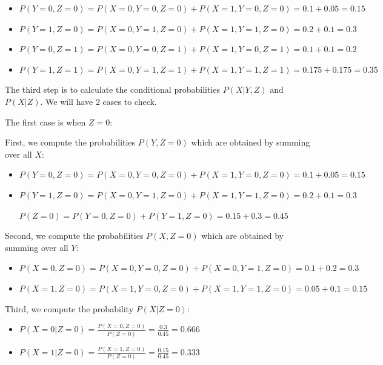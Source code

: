 \documentclass[12pt,letterpaper, onecolumn]{exam}
\begin{document}
\begin{questions}
\begin{parts}
\begin{subparts}
\begin{solution}
                \begin{itemize}
                    \item $P(Y=0,Z=0) = P(X=0,Y=0,Z=0) + P(X=1,Y=0,Z=0) = 0.1 + 0.05 = 0.15$
                    \item $P(Y=1,Z=0) = P(X=0,Y=1,Z=0) + P(X=1,Y=1,Z=0) = 0.2 + 0.1 = 0.3$
                    \item $P(Y=0,Z=1) = P(X=0,Y=0,Z=1) + P(X=1,Y=0,Z=1) = 0.1 + 0.1 = 0.2$
                    \item $P(Y=1,Z=1) = P(X=0,Y=1,Z=1) + P(X=1,Y=1,Z=1) = 0.175 + 0.175 = 0.35$
                \end{itemize}

                The third step is to calculate the conditional probabilities $P(X|Y,Z)$ and $P(X|Z)$. We will have 2 cases to check.

                The first case is when $Z=0$:

                First, we compute the probabilities $P(Y, Z=0)$ which are obtained by summing over all $X$:

                \begin{itemize}
                    \item $P(Y=0, Z=0) = P(X=0, Y=0, Z=0) + P(X=1, Y=0, Z=0) = 0.1 + 0.05 = 0.15$
                    \item $P(Y=1, Z=0) = P(X=0, Y=1, Z=0) + P(X=1, Y=1, Z=0) = 0.2 + 0.1 = 0.3$
                    
                    \begin{center}
                        $P(Z=0) = P(Y=0, Z=0) + P(Y=1, Z=0) = 0.15 + 0.3 = 0.45$
                    \end{center}
                \end{itemize}

                Second, we compute the probabilities $P(X, Z=0)$ which are obtained by summing over all $Y$:

                \begin{itemize}
                    \item $P(X=0, Z=0) = P(X=0, Y=0, Z=0) + P(X=0, Y=1, Z=0) = 0.1 + 0.2 = 0.3$
                    \item $P(X=1, Z=0) = P(X=1, Y=0, Z=0) + P(X=1, Y=1, Z=0) = 0.05 + 0.1 = 0.15$
                \end{itemize}

                Third, we compute the probability $P(X|Z=0)$:

                \begin{itemize}
                    \item $\displaystyle{P(X=0|Z=0) = \frac{P(X=0, Z=0)}{P(Z=0)} = \frac{0.3}{0.45} = 0.666}$
                    \item $\displaystyle{P(X=1|Z=0) = \frac{P(X=1, Z=0)}{P(Z=0)} = \frac{0.15}{0.45} = 0.333}$
                \end{itemize}


\end{solution}
\end{subparts}
\end{parts}
\end{questions}
\end{document}
